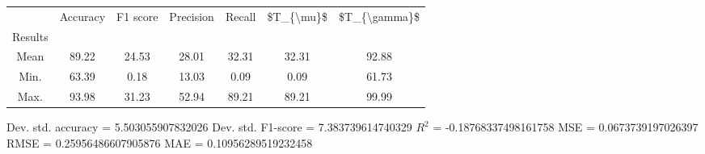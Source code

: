 \begin{tabular}{|c|c|c|c|c|c|c|}
\toprule
{} &  Accuracy &  F1 score &  Precision &  Recall &  \$T\_\{\textbackslash mu\}\$ &  \$T\_\{\textbackslash gamma\}\$ \\
Results &           &           &            &         &            &               \\
\hline
Mean    &     89.22 &     24.53 &      28.01 &   32.31 &      32.31 &         92.88 \\
Min.    &     63.39 &      0.18 &      13.03 &    0.09 &       0.09 &         61.73 \\
Max.    &     93.98 &     31.23 &      52.94 &   89.21 &      89.21 &         99.99 \\
\bottomrule
\end{tabular}

 Dev. std. accuracy = 5.503055907832026
 Dev. std. F1-score = 7.383739614740329
 $R^2$ = -0.18768337498161758
 MSE = 0.0673739197026397
 RMSE = 0.25956486607905876
 MAE = 0.10956289519232458